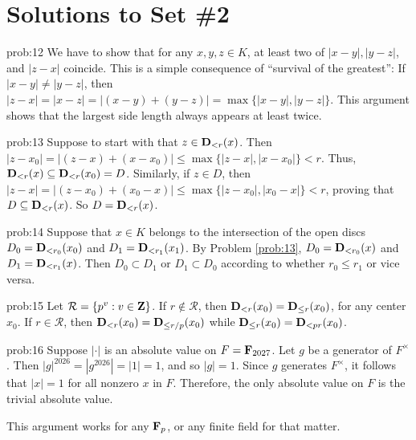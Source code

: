 
\chapter*{Solutions to Set \#2}
\label{set1sols}

\begin{sol}{prob:12} We have to show that for any $x,y,z\in K$, at least two of $|x-y|, |y-z|$, and $|z-x|$ coincide. This is a simple consequence of ``survival of the greatest'': If $|x-y| \ne |y-z|$, then $|z-x| = |x-z| = |(x-y) + (y-z)|= \max\{|x-y|,|y-z|\}$. This argument shows that the largest side length always appears at least twice.
\end{sol}


\begin{sol}{prob:13} Suppose to start with that $z \in \mathbf{D}_{<r}(x)$. Then $|z-x_0| = |(z-x)+(x-x_0)| \le \max\{|z-x|,|x-x_0|\} < r$. Thus, $\mathbf{D}_{<r}(x) \subseteq \mathbf{D}_{<r}(x_0) = D$. Similarly, if $z \in D$, then $|z-x| = |(z-x_0) + (x_0-x)|\le \max\{|z-x_0|,|x_0-x|\} <r$, proving that $D \subseteq \mathbf{D}_{<r}(x)$. So $D = \mathbf{D}_{<r}(x)$.
\end{sol}


\begin{sol}{prob:14} Suppose that $x\in K$ belongs to the intersection of the open discs $D_0 = \mathbf{D}_{<r_0}(x_0)$ and $D_1=\mathbf{D}_{<r_1}(x_1)$. By Problem \ref{prob:13}, $D_0 = \mathbf{D}_{<r_0}(x)$ and $D_1 = \mathbf{D}_{<r_1}(x)$. Then $D_0\subset D_1$ or $D_1 \subset D_0$ according to whether $r_0 \le r_1$ or vice versa.
\end{sol}

\begin{sol}{prob:15} Let $\mathcal{R} = \{p^v: v \in \mathbf{Z}\}$. If $r \notin \mathcal{R}$, then $\mathbf{D}_{<r}(x_0) = \mathbf{D}_{\le r}(x_0)$, for any center $x_0$. If $r \in \mathcal{R}$, then $\mathbf{D}_{<r}(x_0) = \mathbf{D}_{\le r/p}(x_0)$ while $\mathbf{D}_{\le r}(x_0) = \mathbf{D}_{<pr}(x_0)$. 
\end{sol}

\begin{sol}{prob:16} Suppose $|\cdot|$ is an absolute value on $F= \mathbf{F}_{2027}$. Let $g$ be a generator of $F^{\times}$. Then $|g|^{2026} = |g^{2026}| = |1| = 1$, and so $|g|=1$. Since $g$ generates $F^{\times}$, it follows that $|x|=1$ for all nonzero $x$ in $F$. Therefore, the only absolute value on $F$ is the trivial absolute value.

This argument works for any $\mathbf{F}_p$, or any finite field for that matter.
\end{sol}

